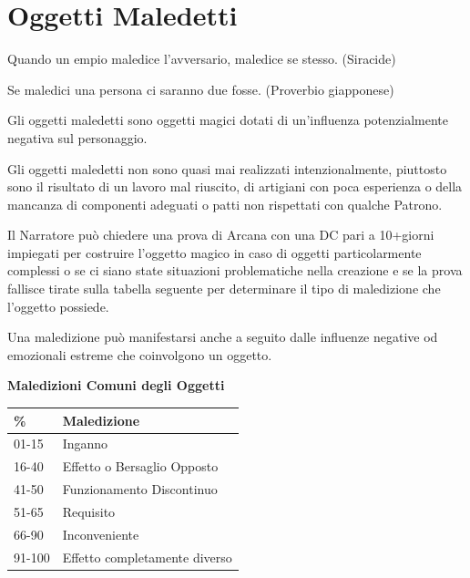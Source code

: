 \section{Oggetti Maledetti}

\begin{enfasi}{Quando un empio maledice l'avversario, maledice se stesso. (Siracide)

\medskip

Se maledici una persona ci saranno due fosse. (Proverbio giapponese)}
\end{enfasi}

\begin{multicols}{2}

\label{oggetti-maledetti}

Gli oggetti maledetti sono oggetti magici dotati di un'influenza potenzialmente negativa sul personaggio.

Gli oggetti maledetti non sono quasi mai realizzati intenzionalmente, piuttosto sono il risultato di un lavoro mal riuscito, di artigiani con poca esperienza o della mancanza di componenti adeguati o patti non rispettati con qualche Patrono.

Il Narratore può chiedere una prova di Arcana con una DC pari a 10+giorni impiegati per costruire l'oggetto magico in caso di oggetti particolarmente complessi o se ci siano state situazioni problematiche nella creazione e se la prova fallisce tirate sulla tabella seguente per determinare il tipo di maledizione che l'oggetto possiede.

Una maledizione può manifestarsi anche a seguito dalle influenze negative od emozionali estreme che coinvolgono un oggetto.

\medskip

\textbf{Maledizioni Comuni degli Oggetti}

\medskip

\noindent\begin{tabularx}{\linewidth}{ll}
	\toprule
\rowcolor{gray!20}\textbf{\%} & \textbf{Maledizione}\\
\toprule
01-15 & Inganno\\
\rowcolor{gray!20}16-40 & Effetto o Bersaglio Opposto\\
41-50 & Funzionamento Discontinuo\\
\rowcolor{gray!20}51-65 & Requisito\\
66-90 & Inconveniente\\
\rowcolor{gray!20}91-100& Effetto completamente diverso
\end{tabularx}


\end{multicols}
